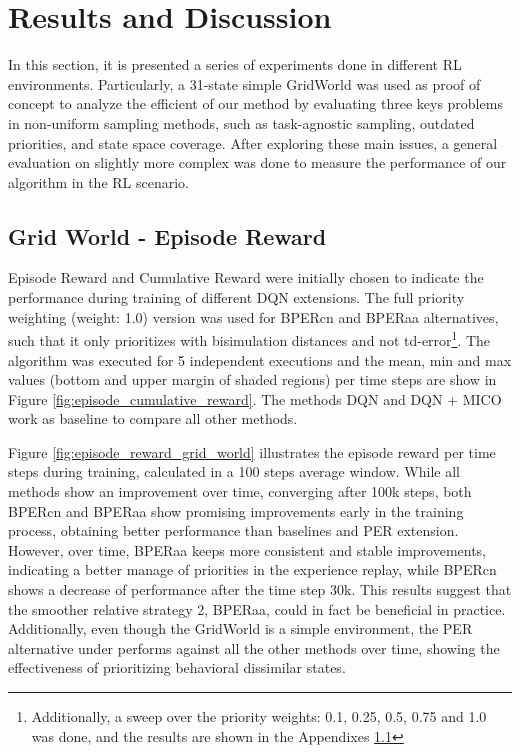 
\chapter{Results and Discussion}

In this section, it is presented a series of experiments done in different RL environments. Particularly, a 31-state simple GridWorld was used as proof of concept to analyze the efficient of our method by evaluating three keys problems in non-uniform sampling methods, such as task-agnostic sampling, outdated priorities, and state space coverage. After exploring these main issues, a general evaluation on slightly more complex was done to measure the performance of our algorithm in the RL scenario.

\section{Grid World - Episode Reward}

Episode Reward and Cumulative Reward were initially chosen to indicate the performance during training of different DQN extensions. The full priority weighting (weight: 1.0) version was used for BPERcn and BPERaa alternatives, such that it only prioritizes with bisimulation distances and not td-error\footnote{Additionally, a sweep over the priority weights: 0.1, 0.25, 0.5, 0.75 and 1.0 was done, and the results are shown in the Appendixes \ref{}}. The algorithm was executed for 5 independent executions and the mean, min and max values (bottom and upper margin of shaded regions) per time steps are show in Figure \ref{fig:episode_cumulative_reward}. The methods DQN and DQN + MICO work as baseline to compare all other methods. 


Figure \ref{fig:episode_reward_grid_world} illustrates the episode reward per time steps during training, calculated in a 100 steps average window. While all methods show an improvement over time, converging after 100k steps, both BPERcn and BPERaa show promising improvements early in the training process, obtaining better performance than baselines and PER extension. However, over time, BPERaa keeps more consistent and stable improvements, indicating a better manage of priorities in the experience replay, while BPERcn shows a decrease of performance after the time step 30k. This results suggest that the smoother relative strategy 2, BPERaa, could in fact be beneficial in practice. Additionally, even though the GridWorld is a simple environment, the PER alternative under performs against all the other methods over time, showing the effectiveness of prioritizing behavioral dissimilar states.

